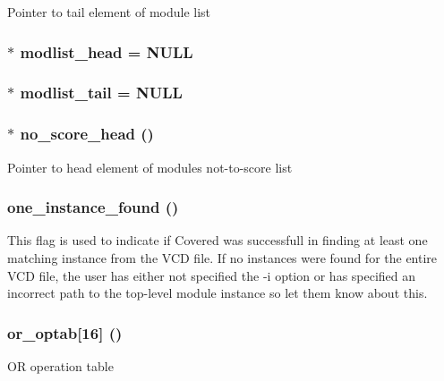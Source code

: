 Pointer to tail element of module list 
\subsubsection{$\ast$ {\bf modlist\_\-head} = NULL}\label{db_8c_a12}


\subsubsection{$\ast$ {\bf modlist\_\-tail} = NULL}\label{db_8c_a13}


\subsubsection{$\ast$ {\bf no\_\-score\_\-head} ()}\label{db_8c_a2}


Pointer to head element of modules not-to-score list 
\subsubsection{ {\bf one\_\-instance\_\-found} ()}\label{db_8c_a7}


This flag is used to indicate if Covered was successfull in finding at least one matching instance from the VCD file. If no instances were found for the entire VCD file, the user has either not specified the -i option or has specified an incorrect path to the top-level module instance so let them know about this. 
\subsubsection{ {\bf or\_\-optab}[16] ()}\label{db_8c_a5}


OR operation table 
